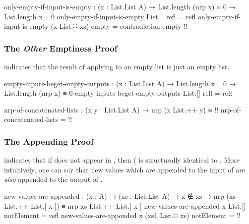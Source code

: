 \documentclass{report}
\begin{document}
\begin{code}
  only-empty-if-input-is-empty :
    (x : List.List A) →
    List.length (nrp x) ≡ 0 →
    List.length x ≡ 0
  only-empty-if-input-is-empty List.[] refl = refl
  only-empty-if-input-is-empty (x List.∷ xs) empty = contradiction empty {!!}
\end{code}

\subsubsection{The \emph{Other} Emptiness Proof}
 indicates that the result of applying  to an empty list is just an empty list.

\begin{code}
  empty-inputs-beget-empty-outputs :
    (x : List.List A) →
    List.length x ≡ 0 →
    List.length (nrp x) ≡ 0
  empty-inputs-beget-empty-outputs List.[] refl = refl
\end{code}

\begin{code}
  nrp-of-concatenated-lists :
    (x y : List.List A) →
    nrp (x List.++ y) ≡ {!!}
  nrp-of-concatenated-lists = {!!}
\end{code}

\subsubsection{The Appending Proof}
 indicates that if  does not appear in , then  \AgdaSymbol(  \AgdaOperator{\AgdaFunction{List.[}}  \AgdaOperator{\AgdaFunction{]}} is structurally identical to    \AgdaOperator{\AgdaFunction{List.[}}  \AgdaOperator{\AgdaFunction{]}}.  More intuitively, one can say that new values which are appended to the input of  are \emph{also} appended to the output of .

\begin{code}
  new-values-are-appended :
    (x : A) →
    (xs : List.List A) →
    x ∉ xs →
    nrp (xs List.++ List.[ x ]) ≡ nrp xs List.++ List.[ x ]
  new-values-are-appended x List.[] notElement = refl
  new-values-are-appended x (xs1 List.∷ xs) notElement = {!!}
\end{code}
\end{document}
